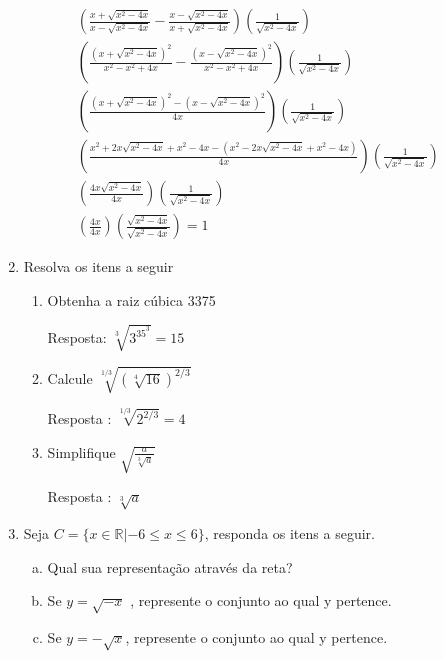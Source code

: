 \documentclass[12pt,onepage,a4paper]{memoir}
\begin{document}
\begin{enumerate}
\begin{align}
  \left( \frac{x + \sqrt{x^2-4x}}{x - \sqrt{x^2-4x}}  - \frac{x - \sqrt{x^2-4x}}{x + \sqrt{x^2-4x}} \right)\left( \frac{1}{\sqrt{x^2-4x}}\right)& \nonumber \\
  \left( \frac{\left(x + \sqrt{x^2-4x}\right)^2}{x^2 - x^2+4x}  - \frac{\left(x - \sqrt{x^2-4x}\right)^2}{x^2  - x^2+4x}\right)\left( \frac{1}{\sqrt{x^2-4x}}\right)& \nonumber \\
  \left( \frac{\left(x + \sqrt{x^2-4x}\right)^2 - \left(x - \sqrt{x^2-4x}\right)^2}{4x}\right)\left( \frac{1}{\sqrt{x^2-4x}}\right)& \nonumber \\
  \left( \frac{x^2  + 2x\sqrt{x^2-4x} + x^2-4x - \left(x^2 - 2x\sqrt{x^2-4x} + x^2-4x\right)}{4x}\right)\left( \frac{1}{\sqrt{x^2-4x}}\right)& \nonumber \\
  \left( \frac{4x\sqrt{x^2-4x}}{4x}\right) \left( \frac{1}{\sqrt{x^2-4x}}\right) & \nonumber \\
   \left( \frac{4x}{4x}\right) \left( \frac{\sqrt{x^2-4x}}{\sqrt{x^2-4x}}\right)  = 1
\end{align}


\item Resolva os itens a seguir

\begin{enumerate}
\item Obtenha a raiz cúbica 3375

  Resposta:  $\sqrt[3]{3^35^3} = 15$
 
\item Calcule $\sqrt[1/3]{\left( \sqrt[4]{16} \right)^{2/3}}$

  Resposta :  $\sqrt[1/3]{2^{2/3}} = 4 $

\item  Simplifique $\sqrt{\frac{a}{\sqrt[3]{a}}}$

  Resposta :  $\sqrt[3]{a}$
 
\end{enumerate}


\item Seja $C=\{ x \in \mathbb{R} | -6 \leq x \leq 6  \}$, responda os itens a seguir.  

    \begin{enumerate}[a)]
    \item  Qual sua representação através da reta?
    \item  Se $y = \sqrt{-x}$ , represente o conjunto ao qual y pertence.
    \item Se $y = -\sqrt{x}$, represente o conjunto ao qual y pertence.
    \end{enumerate}


\end{enumerate}
\end{document}
